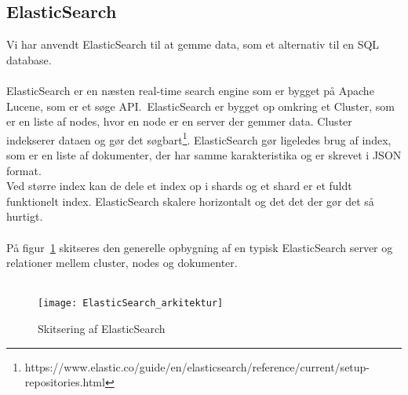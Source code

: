 \subsection{ElasticSearch}
Vi har anvendt ElasticSearch til at gemme data, som et alternativ til en SQL database.
\\\\
ElasticSearch er en næsten real-time search engine som er bygget på Apache Lucene, som er et søge API.\
ElasticSearch er bygget op omkring et Cluster, som er en liste af nodes, hvor en node er en server der gemmer data. Cluster indekserer dataen og gør det søgbart\footnote{https://www.elastic.co/guide/en/elasticsearch/reference/current/setup-repositories.html}.
ElasticSearch gør ligeledes brug af index, som er en liste af dokumenter, der har samme karakteristika og er skrevet i JSON format.
\\
Ved større index kan de dele et index op i shards og et shard er et fuldt funktionelt index.
ElasticSearch skalere horizontalt og det det der gør det så hurtigt.
\\\\
På figur~\ref{fig:elasticsearch-arkitektur} skitseres den generelle opbygning af en typisk ElasticSearch server og relationer mellem cluster, nodes og dokumenter.
\\\\
\begin{figure}[H]
    \texttt{[image: ElasticSearch\_arkitektur]}
    \caption{Skitsering af ElasticSearch}
    \label{fig:elasticsearch-arkitektur}
\end{figure}
\hypertarget{push-or-pull}{}
